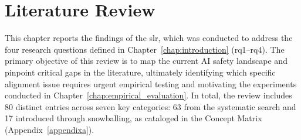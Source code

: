 \chapter{Literature Review}
\label{chap:literature_review}



This chapter reports the findings of the \gls{slr}, which was conducted to address the four research questions defined in Chapter~\ref{chap:introduction} (\gls{rq}1--\gls{rq}4). The primary objective of this review is to map the current AI safety landscape and pinpoint critical gaps in the literature, ultimately identifying which specific alignment issue requires urgent empirical testing and motivating the experiments conducted in Chapter~\ref{chap:empirical_evaluation}. In total, the review includes 80 distinct entries across seven key categories: 63 from the systematic search and 17 introduced through snowballing, as cataloged in the Concept Matrix (Appendix~\ref{appendixa}).











